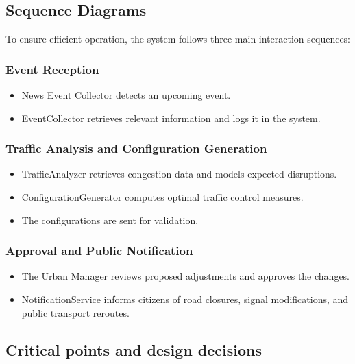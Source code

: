 \documentclass[a4paper,12pt]{article}
\begin{document}
\subsection{Sequence Diagrams}
To ensure efficient operation, the system follows three main interaction sequences:

\subsubsection*{Event Reception}
\begin{itemize}
    \item News Event Collector detects an upcoming event.
    \item EventCollector retrieves relevant information and logs it in the system.
\end{itemize}

\subsubsection*{Traffic Analysis and Configuration Generation}
\begin{itemize}
    \item TrafficAnalyzer retrieves congestion data and models expected disruptions.
    \item ConfigurationGenerator computes optimal traffic control measures.
    \item The configurations are sent for validation.
\end{itemize}

\subsubsection*{Approval and Public Notification}
\begin{itemize}
    \item The Urban Manager reviews proposed adjustments and approves the changes.
    \item NotificationService informs citizens of road closures, signal modifications, and public transport reroutes.
\end{itemize}

\subsection{Critical points and design decisions}
\end{document}
